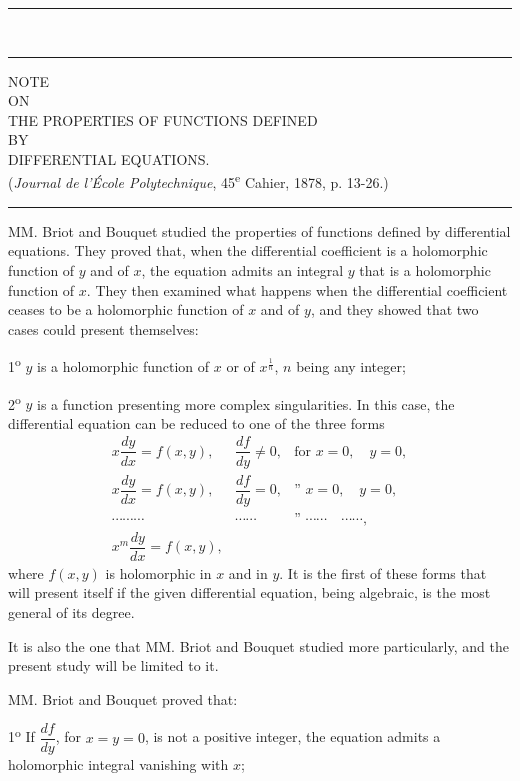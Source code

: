 \documentclass[11pt]{article}
\newcommand{\ornament}{\begin{center}\rule{2.5em}{0.4pt}\,\raisebox{0.1ex}{\tiny$\bullet\bullet\bullet$}\,\rule{2.5em}{0.4pt}\end{center}}
\newcommand{\shortline}{\begin{center}\rule{3.5em}{0.4pt}\end{center}}
\begin{document}
\ornament
\clearpage

\begin{center}
{\Large NOTE}\\[0.8em]
{\small ON}\\[0.8em]
{\LARGE THE PROPERTIES OF FUNCTIONS DEFINED}\\[0.8em]
{\small BY}\\[0.8em]
{\Large DIFFERENTIAL EQUATIONS.}\\[1.2em]
{\small (\emph{Journal de l’École Polytechnique}, 45\textsuperscript{e} Cahier, 1878, p. 13-26.)}
\end{center}
\shortline

MM. Briot and Bouquet studied the properties of functions defined by differential equations. They proved that, when the differential coefficient is a holomorphic function of $y$ and of $x$, the equation admits an integral $y$ that is a holomorphic function of $x$. They then examined what happens when the differential coefficient ceases to be a holomorphic function of $x$ and of $y$, and they showed that two cases could present themselves:

1\textsuperscript{o} $y$ is a holomorphic function of $x$ or of $x^{\frac1n}$, $n$ being any integer;

2\textsuperscript{o} $y$ is a function presenting more complex singularities. In this case, the differential equation can be reduced to one of the three forms
\[
\begin{array}{lll}
x\dfrac{dy}{dx}=f(x,y), & \dfrac{df}{dy}\ne0, & \text{for } x=0,\quad y=0,\\[0.7em]
x\dfrac{dy}{dx}=f(x,y), & \dfrac{df}{dy}=0, & \text{” } x=0,\quad y=0,\\[0.4em]
\cdots\cdots\cdots & \cdots\cdots & \text{” } \cdots\cdots\quad \cdots\cdots,\\[0.7em]
x^m\dfrac{dy}{dx}=f(x,y), & &
\end{array}
\]
where $f(x,y)$ is holomorphic in $x$ and in $y$. It is the first of these forms that will present itself if the given differential equation, being algebraic, is the most general of its degree.

It is also the one that MM. Briot and Bouquet studied more particularly, and the present study will be limited to it.

MM. Briot and Bouquet proved that:

1\textsuperscript{o} If $\dfrac{df}{dy}$, for $x=y=0$, is not a positive integer, the equation admits a holomorphic integral vanishing with $x$;
\end{document}
